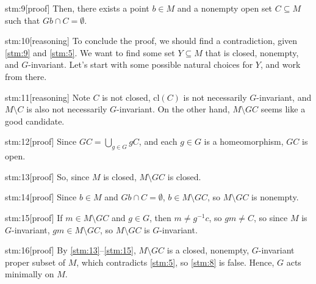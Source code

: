 \documentclass{article}
\begin{document}
\begin{stm}{stm:9}[proof]
Then, there exists a point $b \in M$ and a nonempty open set $C \subseteq M$ such that $Gb \cap C = \emptyset$.
\end{stm}

\begin{stm}{stm:10}[reasoning]
To conclude the proof, we should find a contradiction, given \ref{stm:9} and \ref{stm:5}. We want to find some set $Y \subseteq M$ that is closed, nonempty, and $G$-invariant. Let's start with some possible natural choices for $Y$, and work from there.
\end{stm}

\begin{stm}{stm:11}[reasoning]
Note $C$ is not closed, $\text{cl}(C)$ is not necessarily $G$-invariant, and $M \setminus C$ is also not necessarily $G$-invariant. On the other hand, $M \setminus GC$ seems like a good candidate.
\end{stm}

\begin{stm}{stm:12}[proof]
Since $GC = \bigcup_{g \in G} gC$, and each $g \in G$ is a homeomorphism, $GC$ is open.
\end{stm}

\begin{stm}{stm:13}[proof]
So, since $M$ is closed, $M \setminus GC$ is closed.
\end{stm}

\begin{stm}{stm:14}[proof]
Since $b \in M$ and $Gb \cap C = \emptyset$, $b \in M \setminus GC$, so $M \setminus GC$ is nonempty.
\end{stm}

\begin{stm}{stm:15}[proof]
If $m \in M \setminus GC$ and $g \in G$, then $m \ne g^{-1}c$, so $gm \ne C$, so since $M$ is $G$-invariant, $gm \in M \setminus GC$, so $M \setminus GC$ is $G$-invariant.
\end{stm}

\begin{stm}{stm:16}[proof]
By \ref{stm:13}–\ref{stm:15}, $M \setminus GC$ is a closed, nonempty, $G$-invariant proper subset of $M$, which contradicts \ref{stm:5}, so \ref{stm:8} is false. Hence, $G$ acts minimally on $M$.
\end{stm}
\end{document}
